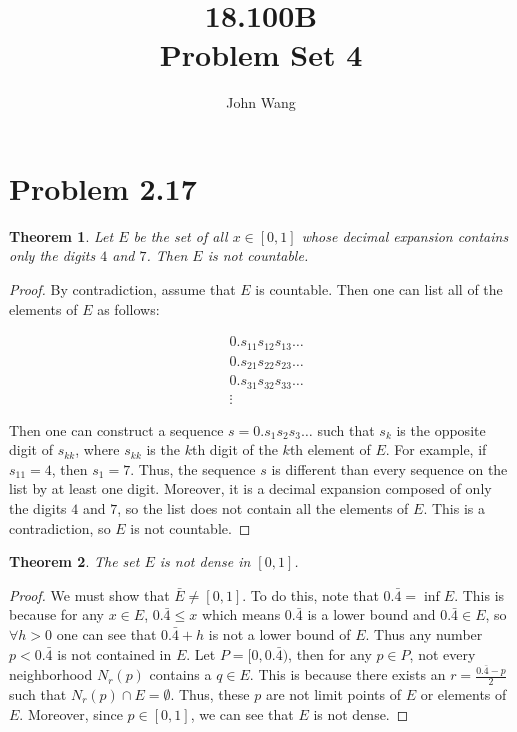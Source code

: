 \documentclass[psamsfonts]{amsart}
\title{18.100B \\
Problem Set 4}
\author{John Wang}
\newtheorem{thm}{Theorem}[section]
\theoremstyle{definition}
\theoremstyle{remark}
\numberwithin{equation}{section}
\begin{document}
\maketitle


\section{Problem 2.17}

\begin{thm}
Let $E$ be the set of all $x \in [0,1]$ whose decimal expansion contains only the digits $4$ and $7$. Then $E$ is not countable.
\end{thm}

\begin{proof}
By contradiction, assume that $E$ is countable. Then one can list all of the elements of $E$ as follows:

\begin{eqnarray*}
&0.s_{11} s_{12} s_{13} \ldots \\
&0.s_{21} s_{22} s_{23} \ldots \\
&0.s_{31} s_{32} s_{33} \ldots \\
&  \vdots
\end{eqnarray*}

Then one can construct a sequence $s = 0.s_1 s_2 s_3 \ldots$ such that $s_k$ is the opposite digit of $s_{kk}$, where $s_{kk}$ is the $k$th digit of the $k$th element of $E$. For example, if $s_{11} = 4$, then $s_1 = 7$. Thus, the sequence $s$ is different than every sequence on the list by at least one digit. Moreover, it is a decimal expansion composed of only the digits $4$ and $7$, so the list does not contain all the elements of $E$. This is a contradiction, so $E$ is not countable.
\end{proof}

\begin{thm}
The set $E$ is not dense in $[0,1]$.
\end{thm}

\begin{proof}
We must show that $\bar{E} \neq [0,1]$. To do this, note that $0.\bar{4} = \inf E$. This is because for any $x \in E$, $0.\bar{4} \leq x$ which means $0.\bar{4}$ is a lower bound and $ 0.\bar{4} \in E$, so $\forall h>0$ one can see that $0.\bar{4} + h$ is not a lower bound of $E$. Thus any number $p < 0.\bar{4}$ is not contained in $E$. Let $P = [0,0.\bar{4})$, then for any $p \in P$, not every neighborhood $N_r(p)$ contains a $q \in E$. This is because there exists an $r = \frac{0.\bar{4} - p}{2}$ such that $N_r(p) \cap E = \emptyset$. Thus, these $p$ are not limit points of $E$ or elements of $E$. Moreover, since $ p \in [0,1]$, we can see that $E$ is not dense. 
\end{proof}
\end{document}
